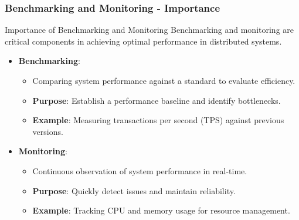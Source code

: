 \documentclass{beamer}
\begin{document}
\begin{frame}[fragile]
    \frametitle{Benchmarking and Monitoring - Importance}
    \begin{block}{Importance of Benchmarking and Monitoring}
        Benchmarking and monitoring are critical components in achieving optimal performance in distributed systems.
    \end{block}
    
    \begin{itemize}
        \item \textbf{Benchmarking}:
        \begin{itemize}
            \item Comparing system performance against a standard to evaluate efficiency.
            \item \textbf{Purpose}: Establish a performance baseline and identify bottlenecks.
            \item \textbf{Example}: Measuring transactions per second (TPS) against previous versions.
        \end{itemize}
        
        \item \textbf{Monitoring}:
        \begin{itemize}
            \item Continuous observation of system performance in real-time.
            \item \textbf{Purpose}: Quickly detect issues and maintain reliability.
            \item \textbf{Example}: Tracking CPU and memory usage for resource management.
        \end{itemize}
    \end{itemize}
\end{frame}
\end{document}
